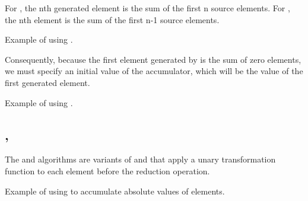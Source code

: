 For , the nth generated element is the sum of the first n source elements. For , the nth element is the sum of the first n-1 source elements.



\begin{codebox}[]{\href{https://compiler-explorer.com/z/3hKaoczE3}{\ExternalLink}}
\footnotesize Example of using .
\tcblower
{}
\end{codebox}

Consequently, because the first element generated by  is the sum of zero elements, we must specify an initial value of the accumulator, which will be the value of the first generated element.

\begin{codebox}[]{\href{https://compiler-explorer.com/z/eEc1PTv8G}{\ExternalLink}}
\footnotesize Example of using .
\tcblower
{}
\end{codebox}

\subsection{\texorpdfstring{,\newline{}}{\texttt{std::transform\_inclusive\_scan},\newline \texttt{std::transform\_exclusive\_scan}}}

The  and  algorithms are variants of  and  that apply a unary transformation function to each element before the reduction operation.


\begin{codebox}[]{\href{https://compiler-explorer.com/z/oxdjMjY1c}{\ExternalLink}}
\footnotesize Example of using  to accumulate absolute values of elements.
\tcblower
{}
\end{codebox}